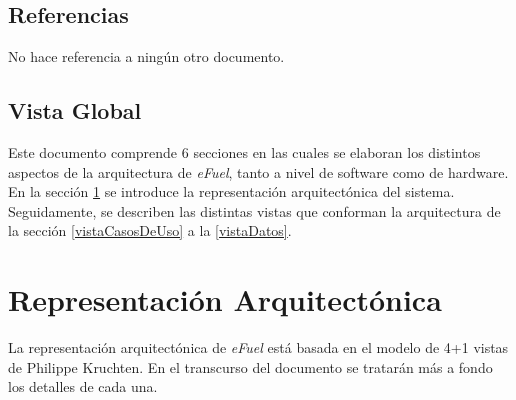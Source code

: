\documentclass{article}
\begin{document}
    \subsection{Referencias}
    No hace referencia a ningún otro documento.

    \subsection{Vista Global}
    Este documento comprende 6 secciones en las cuales se elaboran los distintos aspectos de la arquitectura de \emph{eFuel}, tanto a nivel de software como de hardware. En la sección \ref{reprArq} se introduce la representación arquitectónica del sistema. Seguidamente, se describen las distintas vistas que conforman la arquitectura de la sección \ref{vistaCasosDeUso} a la \ref{vistaDatos}.


    \section{Representación Arquitectónica} \label{reprArq}
    La representación arquitectónica de \emph{eFuel} está basada en el modelo de 4+1 vistas de Philippe Kruchten. En el transcurso del documento se tratarán más a fondo los detalles de cada una.

    
    
    
    
    
    
\end{document}
